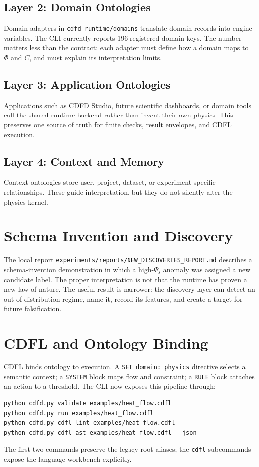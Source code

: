 \documentclass[12pt,a4paper]{article}
\begin{document}
\subsection{Layer 2: Domain Ontologies}
Domain adapters in \texttt{cdfd\_runtime/domains} translate domain records into
engine variables. The CLI currently reports 196 registered domain keys. The
number matters less than the contract: each adapter must define how a domain
maps to $\Phi$ and $C$, and must explain its interpretation limits.

\subsection{Layer 3: Application Ontologies}
Applications such as CDFD Studio, future scientific dashboards, or domain tools
call the shared runtime backend rather than invent their own physics.
This preserves one source of truth for finite checks, result envelopes, and
CDFL execution.

\subsection{Layer 4: Context and Memory}
Context ontologies store user, project, dataset, or experiment-specific
relationships. These guide interpretation, but they do not
silently alter the physics kernel.

\section{Schema Invention and Discovery}
The local report \texttt{experiments/reports/NEW\_DISCOVERIES\_REPORT.md}
describes a schema-invention demonstration in which a high-$\Psi_s$ anomaly was
assigned a new candidate label. The proper interpretation is not that the
runtime has proven a new law of nature. The useful result is narrower: the
discovery layer can detect an out-of-distribution regime, name it, record its
features, and create a target for future falsification.

\section{CDFL and Ontology Binding}
CDFL binds ontology to execution. A \texttt{SET domain: physics} directive
selects a semantic context; a \texttt{SYSTEM} block maps flow and constraint;
a \texttt{RULE} block attaches an action to a threshold. The CLI now exposes
this pipeline through:
\begin{verbatim}
python cdfd.py validate examples/heat_flow.cdfl
python cdfd.py run examples/heat_flow.cdfl
python cdfd.py cdfl lint examples/heat_flow.cdfl
python cdfd.py cdfl ast examples/heat_flow.cdfl --json
\end{verbatim}
The first two commands preserve the legacy root aliases; the \texttt{cdfl}
subcommands expose the language workbench explicitly.
\end{document}
